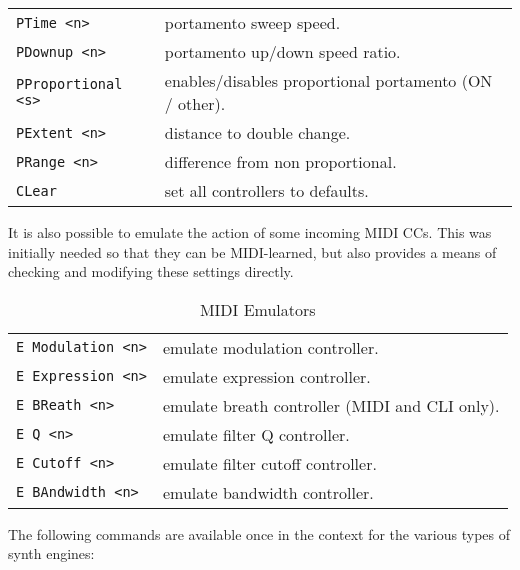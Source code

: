 \begin{table}[H]
\begin{tabular}{l l}
\texttt{PTime <n>} &
   portamento sweep speed. \\
\texttt{PDownup <n>} &
   portamento up/down speed ratio. \\
\texttt{PProportional <s>} &
   enables/disables proportional portamento (ON / other). \\
\texttt{PExtent <n>} &
   distance to double change. \\
\texttt{PRange <n>} &
   difference from non proportional. \\
\texttt{CLear} &
   set all controllers to defaults. \\
      \end{tabular}
   \end{table}

   It is also possible to emulate the action of some incoming MIDI CCs. This
   was initially needed so that they can be MIDI-learned, but also provides
   a means of checking and modifying these settings directly.

   \begin{table}[H]
      \centering
      \caption{MIDI Emulators}
      \label{table:yoshimi_part_midi_emulators}
      \begin{tabular}{l l}
\texttt{E Modulation <n>} &
   emulate modulation controller. \\
\texttt{E Expression <n>} &
   emulate expression controller. \\
\texttt{E BReath <n>} &
   emulate breath controller (MIDI and CLI only). \\
\texttt{E Q <n>} &
   emulate filter Q controller. \\
\texttt{E Cutoff <n>} &
   emulate filter cutoff controller. \\
\texttt{E BAndwidth <n>} &
   emulate bandwidth controller. \\
      \end{tabular}
   \end{table}
\pagebreak
   The following commands are available once in the context for the various
   types of synth engines:

